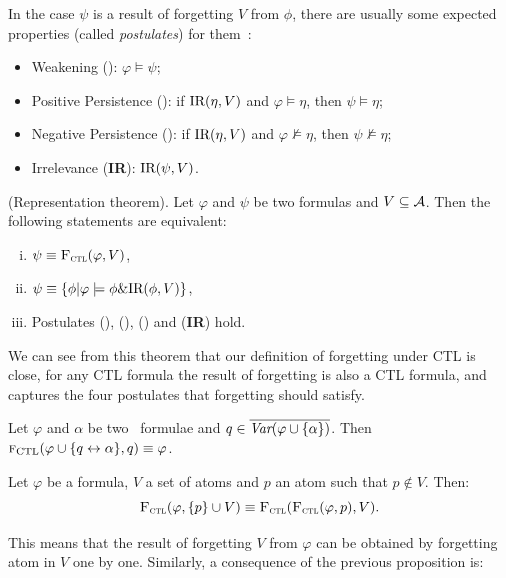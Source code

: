 \documentclass{article}
\begin{document}
In the case $\psi$ is a result of forgetting $V$ from $\phi$, there are usually some
expected properties (called {\em postulates}) for them~\cite{Yan:AIJ:2009}:
\begin{itemize}
  \item Weakening (\W): $\varphi \models \psi$;
  \item Positive Persistence (\PP):
    if $\textrm{IR}(\eta, V)$ and $\varphi \models \eta$, then $\psi \models \eta$;
  \item Negative Persistence (\NgP): if $\textrm{IR}(\eta, V)$ and $\varphi \nvDash \eta$, then $\psi \nvDash \eta$;
  \item Irrelevance (\textbf{IR}): $\textrm{IR}(\psi, V)$.
\end{itemize}



\begin{theorem}\label{thm:close}(Representation theorem).
Let $\varphi$ and $\psi$ be two formulas and $V \subseteq {\cal A}$.
Then the following statements are equivalent:
\begin{enumerate}[(i)]
  \item $\psi \equiv {\textsc{F}_{\textsc{ctl}}}(\varphi, V)$,
  \item $\psi \equiv \{\phi | \varphi \models \phi \& \textrm{IR}(\phi, V)\}$,
  \item Postulates (\W), (\PP), (\NgP) and (\textbf{IR}) hold.
\end{enumerate}
\end{theorem}
We can see from this theorem that our definition of forgetting under CTL is close, \ie for any CTL formula the result of forgetting is also a CTL formula,  and captures the four postulates that forgetting should satisfy.

\begin{lemma}\label{lem:KF:eq}
	Let $\varphi$ and $\alpha$ be two \CTL\ formulae and $q\in
		\overline{\textit{Var}(\varphi\cup\{\alpha\})}$. Then
	${\textsc{f}_{\textrm{CTL}}}(\varphi \cup\{q\leftrightarrow\alpha\}, q)\equiv \varphi$.
\end{lemma}


\begin{proposition}\label{disTF}
Let $\varphi$ be a formula, $V$ a set of atoms and $p$ an atom such that $p \notin V$. Then:
\[
{\textsc{F}_{\textsc{ctl}}}(\varphi, \{p\} \cup V) \equiv {\textsc{F}_{\textsc{ctl}}}({\textsc{F}_{\textsc{ctl}}}(\varphi, p), V).
\]
\end{proposition}
This means that the result of forgetting $V$ from $\varphi$ can be obtained by forgetting atom in $V$ one by one.
Similarly, a consequence of the previous proposition is:
\end{document}
